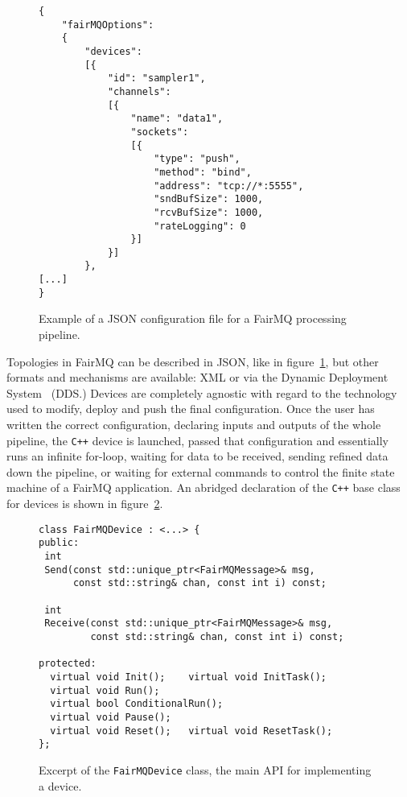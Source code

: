 \documentclass{webofc}
\begin{document}
\begin{figure}[h]
\centering
\begin{verbatim}
{
    "fairMQOptions":
    {
        "devices":
        [{
            "id": "sampler1",
            "channels":
			[{
                "name": "data1",
                "sockets":
				[{
                    "type": "push",
                    "method": "bind",
                    "address": "tcp://*:5555",
                    "sndBufSize": 1000,
                    "rcvBufSize": 1000,
                    "rateLogging": 0
                }]
            }]
        },
[...]
}
\end{verbatim}

\caption{Example of a JSON configuration file for a FairMQ processing pipeline.}
\label{fig-cfg-json}       %
\end{figure}

Topologies in FairMQ can be described in JSON, like in figure~\ref{fig-cfg-json}, but other formats and mechanisms are available: XML or via the Dynamic Deployment System~\cite{ref-dds} (DDS.)
Devices are completely agnostic with regard to the technology used to modify, deploy and push the final configuration.
Once the user has written the correct configuration, declaring inputs and outputs of the whole pipeline, the \texttt{C++} device is launched, passed that configuration and essentially runs an infinite for-loop, waiting for data to be received, sending refined data down the pipeline, or waiting for external commands to control the finite state machine of a FairMQ application.
An abridged declaration of the \texttt{C++} base class for devices is shown in figure~\ref{fig-fairmq-cxx-device}.

\begin{figure}[h]
\centering
\begin{verbatim}
class FairMQDevice : <...> {
public:
 int
 Send(const std::unique_ptr<FairMQMessage>& msg,
      const std::string& chan, const int i) const;

 int
 Receive(const std::unique_ptr<FairMQMessage>& msg,
         const std::string& chan, const int i) const;

protected:
  virtual void Init();    virtual void InitTask();
  virtual void Run();
  virtual bool ConditionalRun();
  virtual void Pause();
  virtual void Reset();   virtual void ResetTask();
};
\end{verbatim}
\caption{Excerpt of the \texttt{FairMQDevice} class, the main API for implementing a device.}
\label{fig-fairmq-cxx-device}
\end{figure}
\end{document}
